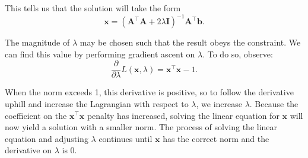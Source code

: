 \documentclass[11pt, twocolumn]{report}
\begin{document}
This tells us that the solution will take the form
\begin{equation}
  \bm{x} = (\bm{A}^\intercal\bm{A} + 2\lambda\bm{I})^{-1}\bm{A}^\intercal\bm{b}.
\end{equation}

The magnitude of $\lambda$ may be chosen such that the result obeys the
constraint. We can find this value by performing gradient ascent on $\lambda$.
To do so, observe:
\begin{equation}
  \frac{\partial}{\partial\lambda} L(\bm{x},\lambda) = \bm{x}^\intercal\bm{x} -
  1.
\end{equation}

When the norm exceeds 1, this derivative is positive, so to follow the
derivative uphill and increase the Lagrangian with respect to $\lambda$, we
increase $\lambda$. Because the coefficient on the $\bm{x}^\intercal\bm{x}$
penalty has increased, solving the linear equation for $\bm{x}$ will now yield
a solution with a smaller norm. The process of solving the linear equation and
adjusting $\lambda$ continues until $\bm{x}$ has the correct norm and the
derivative on $\lambda$ is 0.
\end{document}
